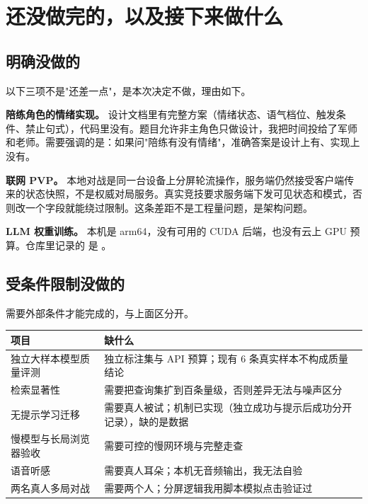 \section{还没做完的，以及接下来做什么}

\subsection{明确没做的}

以下三项不是"还差一点"，是本次决定不做，理由如下。

\textbf{陪练角色的情绪实现。} 设计文档里有完整方案（情绪状态、语气档位、触发条件、禁止句式），代码里没有。题目允许非主角色只做设计，我把时间投给了军师和老师。需要强调的是：如果问"陪练有没有情绪"，准确答案是设计上有、实现上没有。

\textbf{联网 PVP。} 本地对战是同一台设备上分屏轮流操作，服务端仍然接受客户端传来的状态快照，不是权威对局服务。真实竞技要求服务端下发可见状态和模式，否则改一个字段就能绕过限制。这条差距不是工程量问题，是架构问题。

\textbf{LLM 权重训练。} 本机是 arm64，没有可用的 CUDA 后端，也没有云上 GPU 预算。仓库里记录的  是 。

\subsection{受条件限制没做的}

需要外部条件才能完成的，与上面区分开。

\begin{table}[h]
\centering
\small
\begin{tabular}{L{4.2cm}L{9.3cm}}
\toprule
项目 & 缺什么 \\
\midrule
独立大样本模型质量评测 & 独立标注集与 API 预算；现有 6 条真实样本不构成质量结论 \\
检索显著性 & 需要把查询集扩到百条量级，否则差异无法与噪声区分 \\
无提示学习迁移 & 需要真人被试；机制已实现（独立成功与提示后成功分开记录），缺的是数据 \\
慢模型与长局浏览器验收 & 需要可控的慢网环境与完整走查 \\
语音听感 & 需要真人耳朵；本机无音频输出，我无法自验 \\
两名真人多局对战 & 需要两个人；分屏逻辑我用脚本模拟点击验证过 \\
\bottomrule
\end{tabular}
\end{table}

